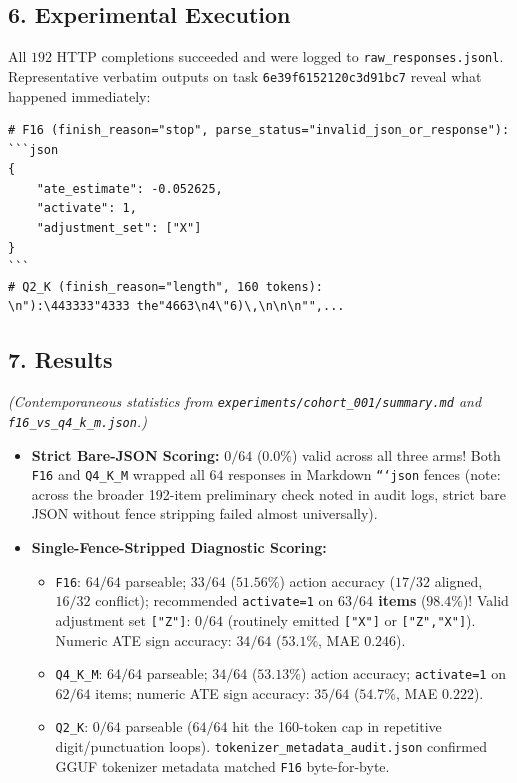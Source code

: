 \subsection*{6. Experimental Execution}
All $192$ HTTP completions succeeded and were logged to \texttt{raw\_responses.jsonl}. Representative verbatim outputs on task \texttt{6e39f6152120c3d91bc7} reveal what happened immediately:
\begin{lstlisting}
# F16 (finish_reason="stop", parse_status="invalid_json_or_response"):
```json
{
    "ate_estimate": -0.052625,
    "activate": 1,
    "adjustment_set": ["X"]
}
```
# Q2_K (finish_reason="length", 160 tokens):
\n"):\443333"4333 the"4663\n4\"6)\,\n\n\n"",...
\end{lstlisting}

\subsection*{7. Results}
\emph{(Contemporaneous statistics from \texttt{experiments/cohort\_001/summary.md} and \texttt{f16\_vs\_q4\_k\_m.json}.)}
\begin{itemize}
  \item \textbf{Strict Bare-JSON Scoring:} $0/64$ ($0.0\%$) valid across all three arms! Both \texttt{F16} and \texttt{Q4\_K\_M} wrapped all $64$ responses in Markdown \texttt{```json} fences (note: across the broader 192-item preliminary check noted in audit logs, strict bare JSON without fence stripping failed almost universally).
  \item \textbf{Single-Fence-Stripped Diagnostic Scoring:}
    \begin{itemize}
      \item \texttt{F16}: $64/64$ parseable; $33/64$ ($51.56\%$) action accuracy ($17/32$ aligned, $16/32$ conflict); recommended \texttt{activate=1} on \textbf{$63/64$ items} ($98.4\%$)! Valid adjustment set \texttt{["Z"]}: \textbf{$0/64$} (routinely emitted \texttt{["X"]} or \texttt{["Z","X"]}). Numeric ATE sign accuracy: $34/64$ ($53.1\%$, MAE $0.246$).
      \item \texttt{Q4\_K\_M}: $64/64$ parseable; $34/64$ ($53.13\%$) action accuracy; \texttt{activate=1} on $62/64$ items; numeric ATE sign accuracy: $35/64$ ($54.7\%$, MAE $0.222$).
      \item \texttt{Q2\_K}: $0/64$ parseable ($64/64$ hit the 160-token cap in repetitive digit/punctuation loops). \texttt{tokenizer\_metadata\_audit.json} confirmed GGUF tokenizer metadata matched \texttt{F16} byte-for-byte.
    \end{itemize}
\end{itemize}


